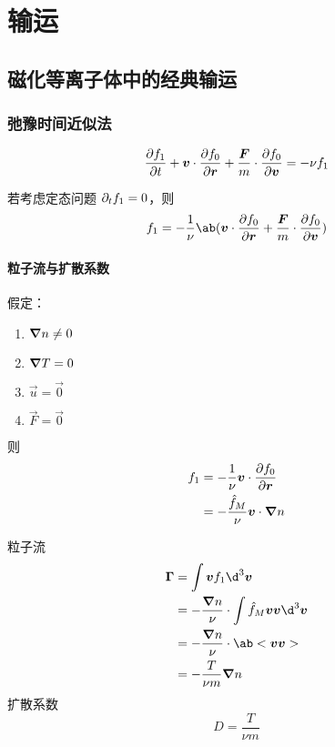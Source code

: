 
\chapter{输运}

\section{磁化等离子体中的经典输运}

\subsection{弛豫时间近似法}

\begin{equation}
\pdv{f_1}{t} + \bm{v} \cdot \pdv{f_0}{\bm{r}}
+ \frac{\bm{F}}{m} \cdot \pdv{f_0}{\bm{v}}
= - \nu f_1
\end{equation}

若考虑定态问题 $\pdv{f_1}!{t}=0$，则
\begin{equation}
f_1 = - \frac{1}{\nu} \ab(\vec{v} \cdot \pdv{f_0}{\vec{r}}
+ \frac{\vec{F}}{m} \cdot \pdv{f_0}{\vec{v}})
\end{equation}

\subsubsection{粒子流与扩散系数}

假定：
\begin{enumerate}
    \item $\bm{\nabla}{n} \neq 0$
    \item $\bm{\nabla}{T} = 0$
    \item $\vec{u} = \vec{0}$
    \item $\vec{F} = \vec{0}$
\end{enumerate}
则
\begin{equation}\begin{aligned}
f_1 &= - \frac{1}{\nu} \bm{v} \cdot \pdv{f_0}{\bm{r}} \\
&=- \frac{\hat{f}_M}{\nu} \bm{v} \cdot \bm{\nabla}{n}
\end{aligned}\end{equation}

粒子流
\begin{equation}\begin{aligned}
\vec{\Gamma} &= \int \vec{v} f_1 \d^3\vec{v} \\
&= - \frac{\grad{n}}{\nu} \cdot \int \hat{f}_M \vec{v}\vec{v} \d^3\vec{v} \\
&= - \frac{\grad{n}}{\nu} \cdot \ab<\vec{v}\vec{v}> \\
&= - \frac{T}{\nu m} \grad{n}
\end{aligned}\end{equation}
扩散系数
\begin{equation}
D = \frac{T}{\nu m}
\end{equation}

